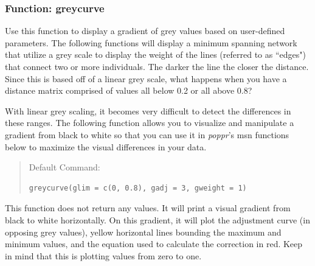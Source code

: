 \documentclass[letterpaper]{article}\usepackage[]{graphicx}\usepackage[]{color}
\makeatletter
\newenvironment{kframe}{%
 \def\at@end@of@kframe{}%
 \ifinner\ifhmode%
  \def\at@end@of@kframe{\end{minipage}}%
  \begin{minipage}{\columnwidth}%
 \fi\fi%
 \def\FrameCommand##1{\hskip\@totalleftmargin \hskip-\fboxsep
 \colorbox{shadecolor}{##1}\hskip-\fboxsep
     \hskip-\linewidth \hskip-\@totalleftmargin \hskip\columnwidth}%
 \MakeFramed {\advance\hsize-\width
   \@totalleftmargin\z@ \linewidth\hsize
   \@setminipage}}%
 {\par\unskip\endMakeFramed%
 \at@end@of@kframe}
\newenvironment{knitrout}{}{} %
\newcommand{\tab}{\hspace*{1em}}
\makeatother
\begin{document}
\subsubsection{Function: greycurve}\label{index:trees:greycurve}
\tab\tab Use this function to display a gradient of grey values based on user-defined parameters. The following functions will display a minimum spanning network that utilize a grey scale to display the weight of the lines (referred to as ``edges") that connect two or more individuals. The darker the line the closer the distance. Since this is based off of a linear grey scale, what happens when you have a distance matrix comprised of values all below 0.2 or all above 0.8? 

With linear grey scaling, it becomes very difficult to detect the differences in these ranges. The following function allows you to visualize and manipulate a gradient from black to white so that you can use it in \textit{poppr}'s msn functions below to maximize the visual differences in your data.

\begin{quote}
Default Command:
\begin{knitrout}
\color{fgcolor}\begin{kframe}
\begin{verbatim}
greycurve(glim = c(0, 0.8), gadj = 3, gweight = 1)
\end{verbatim}
\end{kframe}
\end{knitrout}

\end{quote}


This function does not return any values. It will print a visual gradient from black to white horizontally. On this gradient, it will plot the adjustment curve (in opposing grey values), yellow horizontal lines bounding the maximum and minimum values, and the equation used to calculate the correction in red. Keep in mind that this is plotting values from zero to one.
\end{document}
